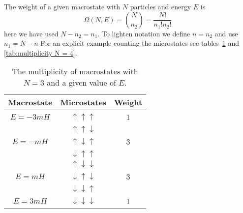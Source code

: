 \documentclass[a4paper]{article}
\begin{document}
    The weight of a given macrostate with \(N\) particles and energy \(E\) is
    \[\Omega(N, E) = {N \choose n_2} = \frac{N!}{n_1!n_2!}\]
    here we have used \(N - n_2 = n_1\).
    To lighten notation we define \(n = n_2\) and use \(n_1 = N - n\)
    For an explicit example counting the microstates see tables~\ref{tab:multiplicity N = 3} and \ref{tab:multiplicity N = 4}.
    \begin{table}[ht]
        \centering
        \begin{tabular}{ccc}\hline
            Macrostate & Microstates & Weight\\\hline
            \(E = -3mH\) & \(\uparrow\uparrow\uparrow\) & 1\\\hline
            & \(\uparrow\uparrow\downarrow\) & \\
            \(E = -mH\) & \(\uparrow\downarrow\uparrow\) & 3\\
            & \(\downarrow\uparrow\uparrow\) & \\\hline
            & \(\uparrow\downarrow\downarrow\) & \\
            \(E = mH\) & \(\downarrow\uparrow\downarrow\) & 3\\
            & \(\downarrow\downarrow\uparrow\) & \\\hline
            \(E = 3mH\) & \(\downarrow\downarrow\downarrow\) & 1\\\hline
        \end{tabular}
        \caption{The multiplicity of macrostates with \(N = 3\) and a given value of \(E\).}
        \label{tab:multiplicity N = 3}
    \end{table}
\end{document}
